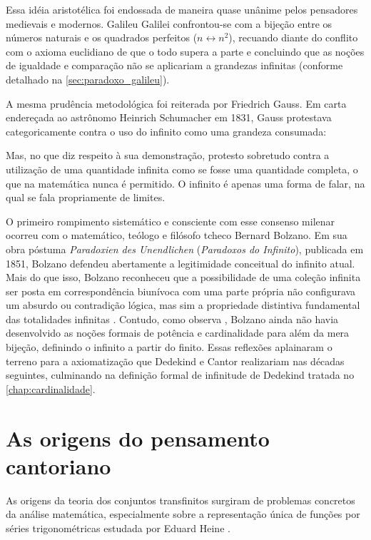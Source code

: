 Essa idéia aristotélica foi endossada de maneira quase unânime pelos pensadores medievais e modernos. Galileu Galilei confrontou-se com a bijeção entre os números naturais e os quadrados perfeitos (\(n \leftrightarrow n^2\)), recuando diante do conflito com o axioma euclidiano de que o todo supera a parte e concluindo que as noções de igualdade e comparação não se aplicariam a grandezas infinitas (conforme detalhado na \autoref{sec:paradoxo_galileu}).

A mesma prudência metodológica foi reiterada por Friedrich Gauss. Em carta endereçada ao astrônomo Heinrich Schumacher em 1831, Gauss protestava categoricamente contra o uso do infinito como uma grandeza consumada:
\begin{citacao}
    Mas, no que diz respeito à sua demonstração, protesto sobretudo contra a utilização de uma quantidade infinita como se fosse uma quantidade completa, o que na matemática nunca é permitido. O infinito é apenas uma forma de falar, na qual se fala propriamente de limites. \parencite[p.~120, tradução própria]{dauben1990}
\end{citacao}

O primeiro rompimento sistemático e consciente com esse consenso milenar ocorreu com o matemático, teólogo e filósofo tcheco Bernard Bolzano. Em sua obra póstuma \emph{Paradoxien des Unendlichen} (\emph{Paradoxos do Infinito}), publicada em 1851, Bolzano defendeu abertamente a legitimidade conceitual do infinito atual. Mais do que isso, Bolzano reconheceu que a possibilidade de uma coleção infinita ser posta em correspondência biunívoca com uma parte própria não configurava um absurdo ou contradição lógica, mas sim a propriedade distintiva fundamental das totalidades infinitas \parencite[p.~423]{bertato2023}. Contudo, como observa \textcite[p.~124]{dauben1990}, Bolzano ainda não havia desenvolvido as noções formais de potência e cardinalidade para além da mera bijeção, definindo o infinito a partir do finito. Essas reflexões aplainaram o terreno para a axiomatização que Dedekind e Cantor realizariam nas décadas seguintes, culminando na definição formal de infinitude de Dedekind tratada no \autoref{chap:cardinalidade}.

\section{As origens do pensamento cantoriano}
\label{sec:origens_pensamento_cantoriano}

As origens da teoria dos conjuntos transfinitos surgiram de problemas concretos da análise matemática, especialmente sobre a representação única de funções por séries trigonométricas estudada por Eduard Heine \parencite[p.~30]{dauben1990}.

